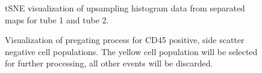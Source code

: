 \documentclass[11pt,a4paper]{article}
\begin{document}
\begin{figure}
   \centering
   \caption{tSNE visualization of upsampling histogram data from separated maps for tube 1 and tube 2.}
\end{figure}

\begin{figure}
   \centering
   \caption{Visualization of pregating process for CD45 positive, side scatter negative cell populations. The yellow cell population will be selected for further processing, all other events will be discarded.}
\end{figure}
\end{document}
